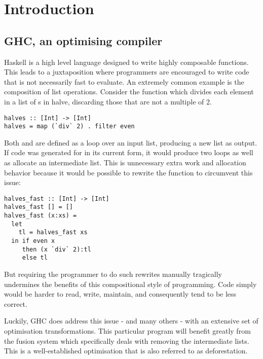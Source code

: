\chapter{Introduction}

\section{GHC, an optimising compiler}

Haskell is a high level language designed to write highly composable functions.
This leads to a juxtaposition where programmers are encouraged to write code that
is not necessarily fast to evaluate. An extremely common example is the composition
of list operations. Consider the function  which divides each element
in a list of s in halve, discarding those that are not a multiple of 2.

\begin{listing}[H]
\begin{verbatim}
halves :: [Int] -> [Int]
halves = map (`div` 2) . filter even
\end{verbatim}
\end{listing}

Both  and  are defined as a loop over an input list, producing a new list as output. 
If code was generated for  in its current form, it would produce two loops as well as allocate
an intermediate list. This is unnecessary extra work and allocation behavior because
it would be possible to rewrite the function to circumvent this issue:

\begin{listing}[H]
\begin{verbatim}
halves_fast :: [Int] -> [Int]
halves_fast [] = []
halves_fast (x:xs) = 
  let 
    tl = halves_fast xs 
  in if even x 
     then (x `div` 2):tl
     else tl
\end{verbatim}
\end{listing}

But requiring the programmer to do such rewrites manually tragically undermines
the benefits of this compositional style of programming. Code simply would be harder to read, write,
maintain, and consequently tend to be less correct. 

Luckily, GHC does address this issue - and many others - with an extensive set of optimisation transformations.
This particular program will benefit greatly from the fusion system which specifically deals with removing
the intermediate lists. This is a well-established optimisation that is also referred to as deforestation. \cite{WADLER1990231}

